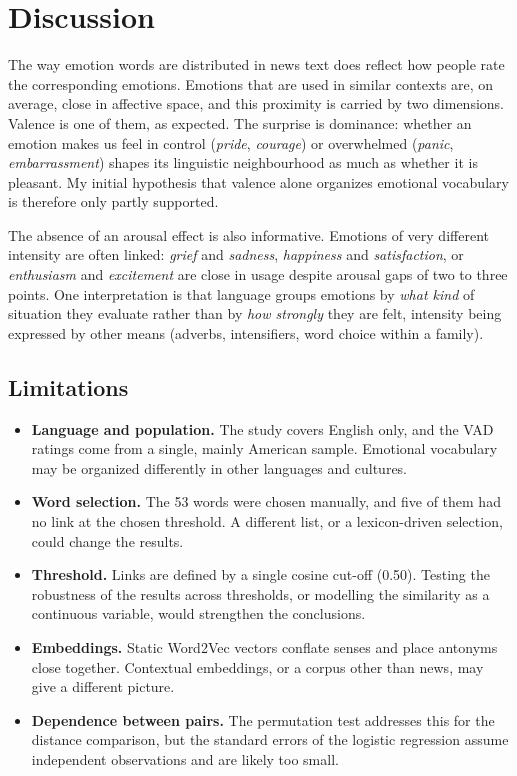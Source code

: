 \documentclass[11pt,a4paper]{article}
\begin{document}
\section{Discussion}

The way emotion words are distributed in news text does reflect how people
rate the corresponding emotions. Emotions that are used in similar contexts
are, on average, close in affective space, and this proximity is carried by
two dimensions. Valence is one of them, as expected. The surprise is
dominance: whether an emotion makes us feel in control (\emph{pride},
\emph{courage}) or overwhelmed (\emph{panic}, \emph{embarrassment}) shapes
its linguistic neighbourhood as much as whether it is pleasant. My initial
hypothesis that valence alone organizes emotional vocabulary is therefore
only partly supported.

The absence of an arousal effect is also informative. Emotions of very
different intensity are often linked: \emph{grief} and \emph{sadness},
\emph{happiness} and \emph{satisfaction}, or \emph{enthusiasm} and
\emph{excitement} are close in usage despite arousal gaps of two to three
points. One
interpretation is that language groups emotions by \emph{what kind} of
situation they evaluate rather than by \emph{how strongly} they are felt,
intensity being expressed by other means (adverbs, intensifiers, word
choice within a family).

\subsection*{Limitations}

\begin{itemize}
  \item \textbf{Language and population.} The study covers English only, and
  the VAD ratings come from a single, mainly American sample. Emotional
  vocabulary may be organized differently in other languages and cultures.
  \item \textbf{Word selection.} The 53 words were chosen manually, and five
  of them had no link at the chosen threshold. A different list, or a
  lexicon-driven selection, could change the results.
  \item \textbf{Threshold.} Links are defined by a single cosine cut-off
  (0.50). Testing the robustness of the results across thresholds, or
  modelling the similarity as a continuous variable, would strengthen the
  conclusions.
  \item \textbf{Embeddings.} Static Word2Vec vectors conflate senses and
  place antonyms close together. Contextual embeddings, or a corpus other
  than news, may give a different picture.
  \item \textbf{Dependence between pairs.} The permutation test addresses
  this for the distance comparison, but the standard errors of the logistic
  regression assume independent observations and are likely too small.
\end{itemize}
\end{document}
